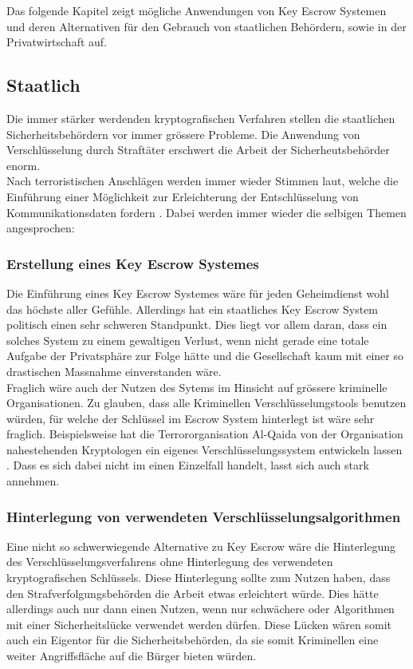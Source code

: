 Das folgende Kapitel zeigt mögliche Anwendungen von Key Escrow Systemen und deren Alternativen für den Gebrauch von staatlichen Behördern, sowie in der Privatwirtschaft auf.
	
	\subsection{Staatlich}
Die immer stärker werdenden kryptografischen Verfahren stellen die staatlichen Sicherheitsbehördern vor immer grössere Probleme. Die Anwendung von Verschlüsselung durch Straftäter erschwert die Arbeit der Sicherheutsbehörder enorm. \\
Nach terroristischen Anschlägen werden immer wieder Stimmen laut, welche die Einführung einer Möglichkeit zur Erleichterung der Entschlüsselung von Kommunikationsdaten fordern \cite{CAMERON} \cite{NSA} \cite{GREGG}. 
Dabei werden immer wieder die selbigen Themen angesprochen:

	\subsubsection{Erstellung eines Key Escrow Systemes}
Die Einführung eines Key Escrow Systemes wäre für jeden Geheimdienst wohl das höchste aller Gefühle. Allerdings hat ein staatliches Key Escrow System politisch einen sehr schweren Standpunkt. Dies liegt vor allem daran, dass ein solches System zu einem gewaltigen Verlust, wenn nicht gerade eine totale Aufgabe der Privatsphäre zur Folge hätte und die Gesellschaft kaum mit einer so drastischen Massnahme einverstanden wäre.\cite {CAMERON} \\
Fraglich wäre auch der Nutzen des Sytems im Hinsicht auf grössere kriminelle Organisationen. Zu glauben, dass alle Kriminellen Verschlüsselungstools benutzen würden, für welche der Schlüssel im Escrow System hinterlegt ist wäre sehr fraglich. Beispielsweise hat die Terrororganisation Al-Qaida von der Organisation nahestehenden Kryptologen ein eigenes Verschlüsselungssystem entwickeln lassen \cite{GREGG}. Dass es sich dabei nicht im einen Einzelfall handelt, lasst sich auch stark annehmen.
	
	\subsubsection{Hinterlegung von verwendeten Verschlüsselungsalgorithmen}
Eine nicht so schwerwiegende Alternative zu Key Escrow wäre die Hinterlegung des Verschlüsselungsverfahrens ohne Hinterlegung des verwendeten kryptografischen Schlüssels. Diese Hinterlegung sollte zum Nutzen haben, dass den Strafverfolgungsbehörden die Arbeit etwas erleichtert würde. Dies hätte allerdings auch nur dann einen Nutzen, wenn nur schwächere oder Algorithmen mit einer Sicherheitslücke verwendet werden dürfen. Diese Lücken wären somit auch ein Eigentor für die Sicherheitsbehörden, da sie somit Kriminellen eine weiter Angriffsfläche auf die Bürger bieten würden. \cite{BUND KP. 7.3.}

